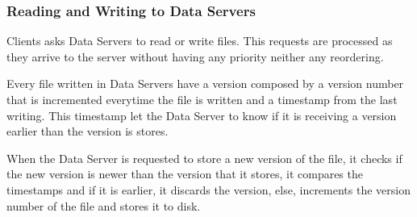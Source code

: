 \subsubsection{Reading and Writing to Data Servers}

Clients asks Data Servers to read or write files. This requests are
processed as they arrive to the server without having any priority neither
any reordering.

Every file written in Data Servers have a version composed by a version
number that is incremented everytime the file is written and a timestamp
from the last writing. This timestamp let the Data Server to know if it is
receiving a version earlier than the version is stores.

When the Data Server is requested to store a new version of the file, it
checks if the new version is newer than the version that it stores, it
compares the timestamps and if it is earlier, it discards the version, else,
increments the version number of the file and stores it to disk.